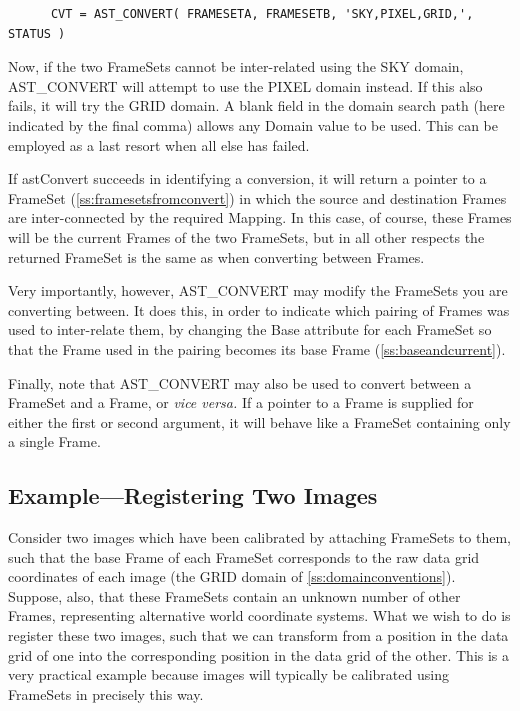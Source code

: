 \documentclass[twoside,11pt]{article}
\newcommand{\htmlref}[2]{#1}
\newcommand{\secref}[1]{\S\ref{#1}}
\renewcommand{\secref}[1]{\ref{#1}}
\begin{document}
\small
\begin{verbatim}
      CVT = AST_CONVERT( FRAMESETA, FRAMESETB, 'SKY,PIXEL,GRID,', STATUS )
\end{verbatim}
\normalsize

Now, if the two FrameSets cannot be inter-related using the SKY domain,
AST\_CONVERT will attempt to use the PIXEL domain instead. If this
also fails, it will try the GRID domain. A blank field in the domain
search path (here indicated by the final comma) allows any Domain
value to be used. This can be employed as a last resort when all else
has failed.

If astConvert succeeds in identifying a conversion, it will return a
pointer to a FrameSet (\secref{ss:framesetsfromconvert}) in which the
source and destination Frames are inter-connected by the required
Mapping. In this case, of course, these Frames will be the current
Frames of the two FrameSets, but in all other respects the returned
FrameSet is the same as when converting between Frames.

Very importantly, however, AST\_CONVERT may modify the FrameSets you
are converting between. It does this, in order to indicate which
pairing of Frames was used to inter-relate them, by changing the \htmlref{Base}{Base}
attribute for each FrameSet so that the Frame used in the pairing
becomes its base Frame (\secref{ss:baseandcurrent}).

Finally, note that AST\_CONVERT may also be used to convert between a
FrameSet and a Frame, or {\em{vice versa.}} If a pointer to a Frame is
supplied for either the first or second argument, it will behave like
a FrameSet containing only a single Frame.

\subsection{\label{ss:registeringimages}Example---Registering Two Images}

Consider two images which have been calibrated by attaching FrameSets
to them, such that the base \htmlref{Frame}{Frame} of each \htmlref{FrameSet}{FrameSet} corresponds to the
raw data grid coordinates of each image (the GRID domain of
\secref{ss:domainconventions}). Suppose, also, that these FrameSets
contain an unknown number of other Frames, representing alternative
world coordinate systems.  What we wish to do is register these two
images, such that we can transform from a position in the data grid of
one into the corresponding position in the data grid of the other.
This is a very practical example because images will typically be
calibrated using FrameSets in precisely this way.
\end{document}
